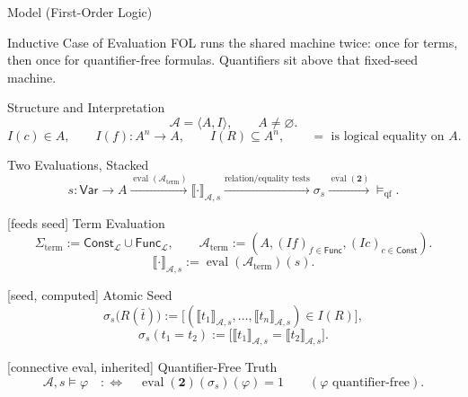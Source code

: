 \documentclass[12pt, a4paper]{report}
\begin{document}
\begin{modelbox}{Model (First-Order Logic)}
\begin{model}\label{model:first-order-logic-sample}

\begin{modelcomponent}{Inductive Case of Evaluation}
FOL runs the shared machine twice: once for terms, then once for quantifier-free
formulas. Quantifiers sit above that fixed-seed machine.
\end{modelcomponent}

\begin{modelcomponent}{Structure and Interpretation}
\[
  \mathcal A=\langle A,I\rangle,
  \qquad
  A\neq\varnothing.
\]
\[
  I(c)\in A,
  \qquad
  I(f):A^n\to A,
  \qquad
  I(R)\subseteq A^n,
  \qquad
  =\text{ is logical equality on }A.
\]
\end{modelcomponent}

\begin{modelcomponent}{Two Evaluations, Stacked}
\[
  s:\mathsf{Var}\to A
  \xrightarrow{\operatorname{eval}(\mathcal A_{\mathrm{term}})}
  \llbracket\cdot\rrbracket_{\mathcal A,s}
  \xrightarrow{\text{relation/equality tests}}
  \sigma_s
  \xrightarrow{\operatorname{eval}(\mathbf 2)}
  \models_{\mathrm{qf}}.
\]
\end{modelcomponent}

\begin{modelcomponent}{[feeds seed] Term Evaluation}
\[
  \Sigma_{\mathrm{term}}
  :=
  \mathsf{Const}_{\mathcal L}\cup\mathsf{Func}_{\mathcal L},
  \qquad
  \mathcal A_{\mathrm{term}}
  :=
  (A,(I f)_{f\in\mathsf{Func}},(I c)_{c\in\mathsf{Const}}).
\]
\[
  \llbracket\cdot\rrbracket_{\mathcal A,s}
  :=
  \operatorname{eval}(\mathcal A_{\mathrm{term}})(s).
\]
\end{modelcomponent}

\begin{modelcomponent}{[seed, computed] Atomic Seed}
\[
  \sigma_s\bigl(R(\bar t)\bigr)
  :=
  \bigl[
    (\llbracket t_1\rrbracket_{\mathcal A,s},\ldots,
    \llbracket t_n\rrbracket_{\mathcal A,s})
    \in I(R)
  \bigr],
\]
\[
  \sigma_s(t_1=t_2)
  :=
  \bigl[
    \llbracket t_1\rrbracket_{\mathcal A,s}
    =
    \llbracket t_2\rrbracket_{\mathcal A,s}
  \bigr].
\]
\end{modelcomponent}

\begin{modelcomponent}{[connective eval, inherited] Quantifier-Free Truth}
\[
  \mathcal A,s\models\varphi
  \quad:\Longleftrightarrow\quad
  \operatorname{eval}(\mathbf 2)(\sigma_s)(\varphi)=1
  \qquad(\varphi\text{ quantifier-free}).
\]
\end{modelcomponent}


\end{model}
\end{modelbox}
\end{document}
